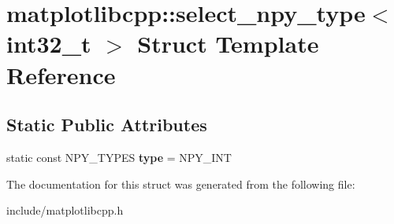 \hypertarget{structmatplotlibcpp_1_1select__npy__type_3_01int32__t_01_4}{}\section{matplotlibcpp\+:\+:select\+\_\+npy\+\_\+type$<$ int32\+\_\+t $>$ Struct Template Reference}
\label{structmatplotlibcpp_1_1select__npy__type_3_01int32__t_01_4}
\subsection*{Static Public Attributes}
\begin{DoxyCompactItemize}
\item 
static const N\+P\+Y\+\_\+\+T\+Y\+P\+ES {\bfseries type} = N\+P\+Y\+\_\+\+I\+NT\hypertarget{structmatplotlibcpp_1_1select__npy__type_3_01int32__t_01_4_abcfd0c3dc5d5e92575c04747315cb4d5}{}\label{structmatplotlibcpp_1_1select__npy__type_3_01int32__t_01_4_abcfd0c3dc5d5e92575c04747315cb4d5}

\end{DoxyCompactItemize}


The documentation for this struct was generated from the following file\+:\begin{DoxyCompactItemize}
\item 
include/matplotlibcpp.\+h\end{DoxyCompactItemize}
